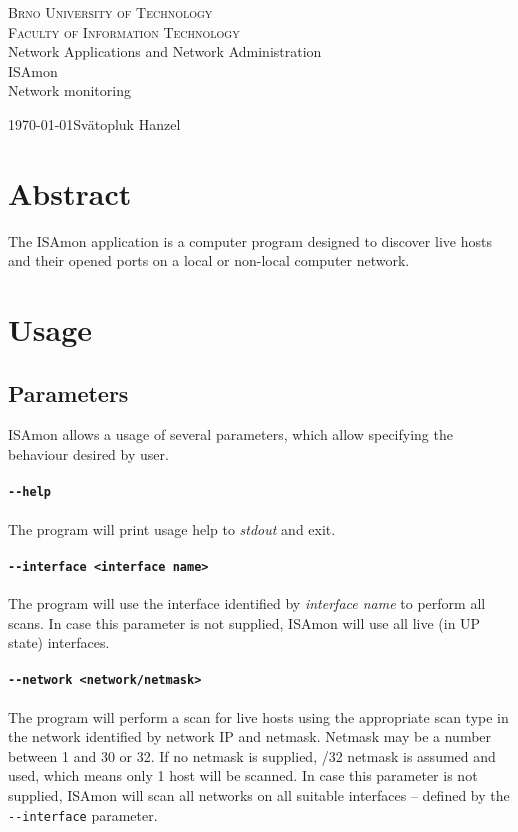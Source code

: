 \documentclass[11pt,a4paper]{article}
\begin{document}
\begin{titlepage}
	\begin{center}
	    {\LARGE\textsc{Brno University of Technology}}\\
	    \smallskip
	    {\Large\textsc{Faculty of Information Technology}}\\
	    \bigskip
	    \LARGE{Network Applications and Network Administration}\\
	    \smallskip
		\Huge{ISAmon}\\
		\huge{Network monitoring}
	\end{center}
    {\today \hfill Svätopluk Hanzel}
\end{titlepage}

\tableofcontents

\newpage
\section*{Abstract}
	The ISAmon application is a computer program designed to discover live hosts and their opened ports on a local or non-local computer network.
\newpage

\section{Usage}
	\subsection{Parameters}
		ISAmon allows a usage of several parameters, which allow specifying the behaviour desired by user.
		\paragraph{\texttt{-{}-help}} The program will print usage help to \emph{stdout} and exit.
		\vspace{-0.5cm}
		\paragraph{\texttt{-{}-interface <interface name>}} The program will use the interface identified by \emph{interface name} to perform all scans. In case this parameter is not supplied, ISAmon will use all live (in UP state) interfaces.
		\vspace{-0.5cm}
		\paragraph{\texttt{-{}-network <network/netmask>}} The program will perform a scan for live hosts using the appropriate scan type in the network identified by network IP and netmask. Netmask may be a number between 1 and 30 or 32. If no netmask is supplied, /32 netmask is assumed and used, which means only 1 host will be scanned. In case this parameter is not supplied, ISAmon will scan all networks on all suitable interfaces -- defined by the \texttt{-{}-interface} parameter.
		\vspace{-0.5cm}
\end{document}
